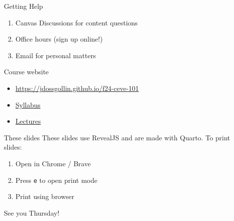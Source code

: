 \documentclass[
  ignorenonframetext,
]{beamer}
\providecommand{\tightlist}{%
  \setlength{\itemsep}{0pt}\setlength{\parskip}{0pt}}\usepackage{longtable,booktabs,array}
\begin{document}
\begin{frame}{Getting Help}
\label{getting-help}
\begin{enumerate}
\tightlist
\item
  Canvas Discussions for content questions
\item
  Office hours (sign up online!)
\item
  Email for personal matters
\end{enumerate}
\end{frame}

\begin{frame}{Course website}
\label{course-website}
\begin{itemize}
\tightlist
\item
  \url{https://jdossgollin.github.io/f24-ceve-101}
\item
  \href{https://jdossgollin.github.io/f24-ceve-101/syllabus.html}{Syllabus}
\item
  \href{https://jdossgollin.github.io/f24-ceve-101/lectures.html}{Lectures}
\end{itemize}
\end{frame}

\begin{frame}[fragile]{These slides}
\label{these-slides}
These slides use RevealJS and are made with Quarto. To print slides:

\begin{enumerate}
\tightlist
\item
  Open in Chrome / Brave
\item
  Press \texttt{e} to open print mode
\item
  Print using browser
\end{enumerate}
\end{frame}

\begin{frame}{See you Thursday!}
\label{see-you-thursday}
\end{frame}
\end{document}
